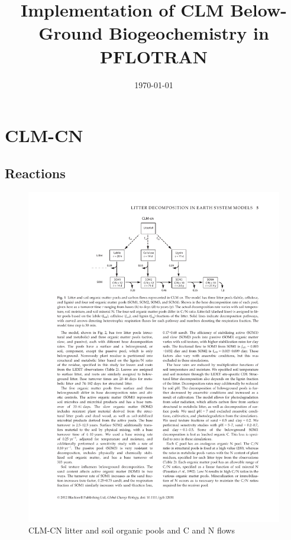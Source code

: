 \documentclass[12pt, a4paper]{article}
\title{Implementation of CLM Below-Ground Biogeochemistry in PFLOTRAN}
\date\today{}
\begin{document}
\maketitle

\begin{abstract}
\end{abstract}

\section{CLM-CN}
\subsection{Reactions}
\begin{figure}[h]
\centering
\includegraphics[width=1.0\textwidth]{Bonan.pdf}
\caption{CLM-CN litter and soil organic pools and C and N flows \cite{Bonanetal2012}}
\label{Fig1}
\end{figure}
\end{document}
